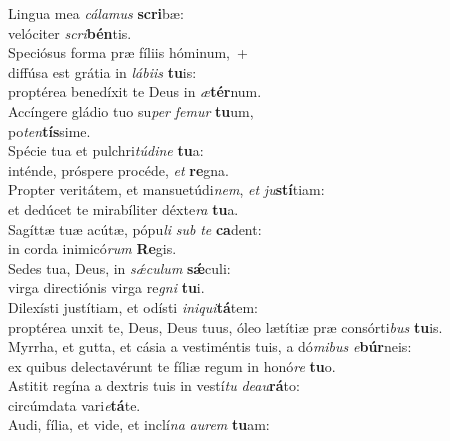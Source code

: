 \evenverse Lingua mea \textit{cá}\textit{la}\textit{mus} \textbf{scri}bæ:~\*\\
\evenverse velóciter \textit{scri}\textbf{bén}tis.\\
\oddverse Speciósus forma præ fíliis hóminum,~+\\
\oddverse  diffúsa est grátia in \textit{lá}\textit{bi}\textit{is} \textbf{tu}is:~\*\\
\oddverse proptérea benedíxit te Deus in \textit{æ}\textbf{tér}num.\\
\evenverse Accíngere gládio tuo su\textit{per} \textit{fe}\textit{mur} \textbf{tu}um,~\*\\
\evenverse po\textit{ten}\textbf{tís}sime.\\
\oddverse Spécie tua et pulchri\textit{tú}\textit{di}\textit{ne} \textbf{tu}a:~\*\\
\oddverse inténde, próspere procéde, \textit{et} \textbf{re}gna.\\
\evenverse Propter veritátem, et mansuetúdi\textit{nem}, \textit{et} \textit{ju}\textbf{stí}tiam:~\*\\
\evenverse et dedúcet te mirabíliter déxte\textit{ra} \textbf{tu}a.\\
\oddverse Sagíttæ tuæ acútæ, pópu\textit{li} \textit{sub} \textit{te} \textbf{ca}dent:~\*\\
\oddverse in corda inimicó\textit{rum} \textbf{Re}gis.\\
\evenverse Sedes tua, Deus, in \textit{sǽ}\textit{cu}\textit{lum} \textbf{sǽ}culi:~\*\\
\evenverse virga directiónis virga re\textit{gni} \textbf{tu}i.\\
\oddverse Dilexísti justítiam, et odísti \textit{i}\textit{ni}\textit{qui}\textbf{tá}tem:~\*\\
\oddverse proptérea unxit te, Deus, Deus tuus, óleo lætítiæ præ consórti\textit{bus} \textbf{tu}is.\\
\evenverse Myrrha, et gutta, et cásia a vestiméntis tuis, a dó\textit{mi}\textit{bus} \textit{e}\textbf{búr}neis:~\*\\
\evenverse ex quibus delectavérunt te fíliæ regum in honó\textit{re} \textbf{tu}o.\\
\oddverse Astitit regína a dextris tuis in vestí\textit{tu} \textit{de}\textit{au}\textbf{rá}to:~\*\\
\oddverse circúmdata vari\textit{e}\textbf{tá}te.\\
\evenverse Audi, fília, et vide, et inclí\textit{na} \textit{au}\textit{rem} \textbf{tu}am:~\*\\
